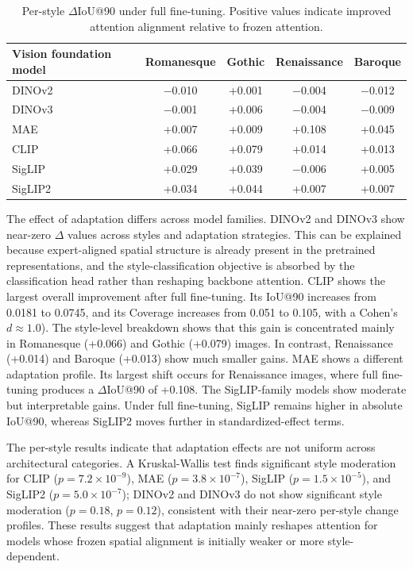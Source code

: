\documentclass[lineno,pdflatex,sn-mathphys-num]{sn-jnl}%
\theoremstyle{thmstyleone}%
\theoremstyle{thmstyletwo}%
\theoremstyle{thmstylethree}%
\begin{document}
\begin{table}[!h]
\centering
\caption{Per-style $\Delta$IoU@90 under full fine-tuning. Positive values indicate improved attention alignment relative to frozen attention.}
\label{table RQ3 perstyle}
\begin{tabular}{lcccc}
\toprule
Vision foundation model & Romanesque & Gothic & Renaissance & Baroque \\ \midrule
DINOv2  & $-$0.010 & +0.001 & $-$0.004 & $-$0.012 \\
DINOv3  & $-$0.001 & +0.006 & $-$0.004 & $-$0.009 \\
MAE     & +0.007 & +0.009 & +0.108 & +0.045 \\
CLIP    & +0.066 & +0.079 & +0.014 & +0.013 \\
SigLIP  & +0.029 & +0.039 & $-$0.006 & +0.005 \\
SigLIP2 & +0.034 & +0.044 & +0.007 & +0.007 \\
\bottomrule
\end{tabular}
\end{table}

The effect of adaptation differs across model families. DINOv2 and DINOv3 show near-zero $\Delta$ values across styles and adaptation strategies. This can be explained because expert-aligned spatial structure is already present in the pretrained representations, and the style-classification objective is absorbed by the classification head rather than reshaping backbone attention. CLIP shows the largest overall improvement after full fine-tuning. Its IoU@90 increases from 0.0181 to 0.0745, and its Coverage increases from 0.051 to 0.105, with a Cohen's $d \approx 1.0$). The style-level breakdown shows that this gain is concentrated mainly in Romanesque (+0.066) and Gothic (+0.079) images. In contrast, Renaissance (+0.014) and Baroque (+0.013) show much smaller gains. MAE shows a different adaptation profile. Its largest shift occurs for Renaissance images, where full fine-tuning produces a $\Delta$IoU@90 of +0.108. The SigLIP-family models show moderate but interpretable gains. Under full fine-tuning, SigLIP remains higher in absolute IoU@90, whereas SigLIP2 moves further in standardized-effect terms. 

The per-style results indicate that adaptation effects are not uniform across architectural categories. A Kruskal-Wallis test finds significant style moderation for CLIP ($p=7.2\times10^{-9}$), MAE ($p=3.8\times10^{-7}$), SigLIP ($p=1.5\times10^{-5}$), and SigLIP2 ($p=5.0\times10^{-7}$); DINOv2 and DINOv3 do not show significant style moderation ($p=0.18$, $p=0.12$), consistent with their near-zero per-style change profiles. These results suggest that adaptation mainly reshapes attention for models whose frozen spatial alignment is initially weaker or more style-dependent.
\end{document}
